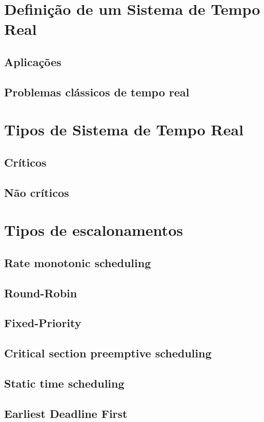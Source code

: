 \section{\label{sec:secao3}Definição de um Sistema de Tempo Real}
\subsection{Aplicações}
\subsection{Problemas clássicos de tempo real}

\section{\label{sec:secao3}Tipos de Sistema de Tempo Real}
\subsection{Críticos}
\subsection{Não críticos}

\section{\label{sec:secao4}Tipos de escalonamentos}
\subsection{Rate monotonic scheduling}
\subsection{Round-Robin}
\subsection{Fixed-Priority}
\subsection{Critical section preemptive scheduling}
\subsection{Static time scheduling}
\subsection{Earliest Deadline First}

